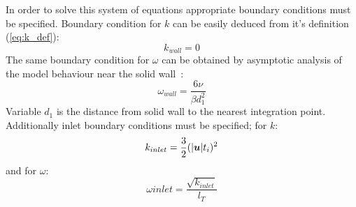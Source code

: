         In order to solve this system of equations appropriate boundary conditions must be specified. Boundary condition for $k$ can be easily deduced from it's definition (\ref{eq:k_def}):
        \begin{equation}
            k_{wall} = 0
        \end{equation}
        The same boundary condition for $\omega$ can be obtained by asymptotic analysis of the model behaviour near the solid wall~\cite{Wilcox}:
        \begin{equation}
            \omega_{wall} = \dfrac{6\nu}{\beta d_1^2}
        \end{equation}
        Variable $d_1$ is the distance from solid wall to the nearest integration point.
        Additionally inlet boundary conditions must be specified; for $k$:
        \begin{equation*}
            k_{inlet} = \dfrac{3}{2}(\lvert { \bm{{u}} } \rvert t_i)^2
        \end{equation*}
        and for $\omega$:
        \begin{equation*}
            \omega{inlet} = \dfrac{\sqrt{k_{inlet}}}{l_T}
        \end{equation*}

        
